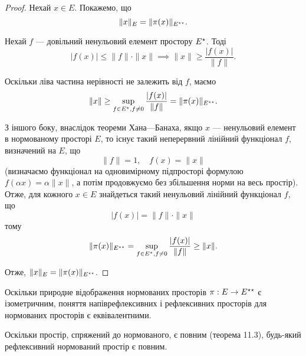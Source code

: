 \begin{proof}
Нехай $x \in E$. Покажемо, що
\begin{equation*}
    \|x\|_E = \|\pi(x)\|_{E^{\star\star}}.
\end{equation*}

Нехай $f$ --- довільний ненульовий елемент простору $E^\star$. Тоді
\begin{equation*}
    |f(x)| \le \|f\| \cdot \|x\| \implies \|x\| \ge \frac{|f(x)|}{\|f\|}.
\end{equation*}

Оскільки ліва частина нерівності не залежить від $f$, маємо
\begin{equation*}
    \|x\| \ge \sup_{f \in E^\star, f \ne 0} \frac{|f(x)|}{\|f\|} =
    \|\pi(x)\|_{E^{\star\star}}.
\end{equation*}
 
З іншого боку, внаслідок теореми Хана---Банаха, якщо $x$ ---
ненульовий елемент в нормованому просторі $E$, то існує
такий неперервний лінійний функціонал $f$, визначений на
$E$, що
\begin{equation*}
    \|f\| = 1, \quad f(x) = \|x\|
\end{equation*}
(визначаємо функціонал на одновимірному підпросторі
формулою $f(\alpha x) = \alpha \|x\|$, а потім продовжуємо без
збільшення норми на весь простір). Отже, для кожного $x \in E$
знайдеться такий ненульовий лінійний функціонал $f$, що
\begin{equation*}
    |f(x)| = \|f\| \cdot \|x\|
\end{equation*}
тому
\begin{equation*}
    \|\pi(x)\|_{E^{\star\star}} =
    \sup_{f \in E^\star, f \ne 0} \frac{|f(x)|}{\|f\|}
    \ge \|x\|.
\end{equation*}

Отже, $\|x\|_E = \|\pi(x)\|_{E^{\star\star}}$.
\end{proof}

\begin{remark}
Оскільки природне відображення
нормованих просторів $\pi: E \to E^{\star\star}$ є ізометричним, поняття
напіврефлексивних і рефлексивних просторів для нормованих
просторів є еквівалентними.
\end{remark}

\begin{remark}
Оскільки простір, спряжений до
нормованого, є повним (теорема 11.3), будь-який
рефлексивний нормований простір є повним.
\end{remark}

